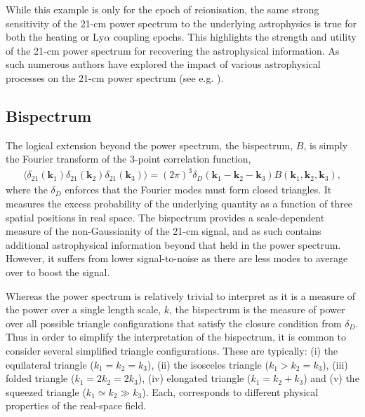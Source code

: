 While this example is only for the epoch of reionisation, the same strong sensitivity of the 21-cm power spectrum to the underlying astrophysics is true for both the heating or Ly$\alpha$ coupling epochs. This highlights the strength and utility of the 21-cm power spectrum for recovering the astrophysical information. As such numerous authors have explored the impact of various astrophysical processes on the 21-cm power spectrum (see e.g. \cite{Bowman:2006,Furlanetto:2006a,Iliev:2006,McQuinn:2006,McQuinn:2007,Pritchard:2007,Lidz:2008,Santos:2008,Baek:2010,Harker:2010,Mesinger:2013,Fialkov:2014,Pober:2014,Greig:2015,Geil:2016,Greig:2017b,Hassan:2017,Cohen:2018,Greig:2018,Park:2019,Seiler:2019}).

\subsection{Bispectrum} \label{sec:bispectrum}

The logical extension beyond the power spectrum, the bispectrum, $B$, is simply the Fourier transform of the 3-point correlation function,
\begin{eqnarray}
\langle \delta_{21}(\mathbf{k}_{1})\delta_{21}(\mathbf{k}_{2})\delta_{21}(\mathbf{k}_{3}) \rangle = (2\pi)^{3}\delta_{D}( \mathbf{k}_{1} - \mathbf{k}_{2} - \mathbf{k}_{3})B(\mathbf{k}_{1},\mathbf{k}_{2},\mathbf{k}_{3}),
\end{eqnarray}
where the $\delta_{D}$ enforces that the Fourier modes must form closed triangles. It measures the excess probability of the underlying quantity as a function of three spatial positions in real space. The bispectrum provides a scale-dependent measure of the non-Gaussianity of the 21-cm signal, and as such contains additional astrophysical information beyond that held in the power spectrum. However, it suffers from lower signal-to-noise as there are less modes to average over to boost the signal.

Whereas the power spectrum is relatively trivial to interpret as it is a measure of the power over a single length scale, $k$, the bispectrum is the measure of power over all possible triangle configurations that satisfy the closure condition from $\delta_{D}$. Thus in order to simplify the interpretation of the bispectrum, it is common to consider several simplified triangle configurations. These are typically: (i) the equilateral triangle ($k_{1}  = k_{2} = k_{3}$), (ii) the isosceles triangle ($k_{1} > k_{2} = k_{3}$), (iii) folded triangle ($k_{1} = 2k_{2} = 2k_{3}$), (iv) elongated triangle ($k_{1} = k_{2} + k_{3}$) and (v) the squeezed triangle ($k_{1} \simeq k_{2} \gg k_{3}$). Each, corresponds to different physical properties of the real-space field.

